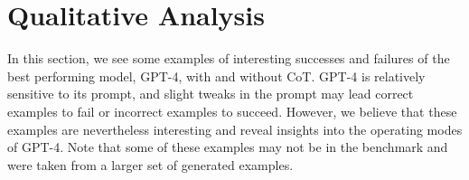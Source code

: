 \section{Qualitative Analysis} \label{sec:appendix-qualitative}
In this section, we see some examples of interesting successes and failures of the best performing model, GPT-4, with and without CoT. GPT-4 is relatively sensitive to its prompt, and slight tweaks in the prompt may lead correct examples to fail or incorrect examples to succeed. However, we believe that these examples are nevertheless interesting and reveal insights into the operating modes of GPT-4. Note that some of these examples may not be in the benchmark and were taken from a larger set of generated examples.



